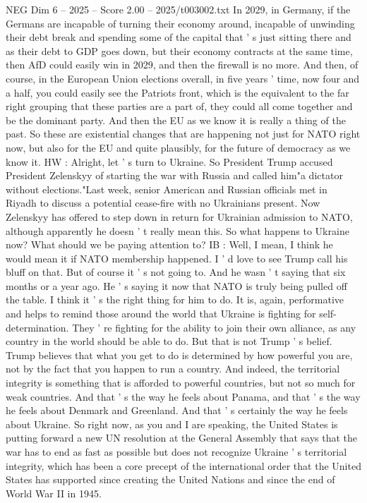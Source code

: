 \begin{textsample}{NEG Dim 6 – 2025 – Score 2.00 – 2025/t003002.txt}
In 2029, in Germany, if the Germans are incapable of turning their economy around, incapable of unwinding their debt break and spending some of the capital that ' s just sitting there and as their debt to GDP goes down, but their economy contracts at the same time, then AfD could easily win in 2029, and then the firewall is no more.
And then, of course, in the European Union elections overall, in five years ' time, now four and a half, you could easily see the Patriots front, which is the equivalent to the far right grouping that these parties are a part of, they could all come together and be the dominant party.
And then the EU as we know it is really a thing of the past.
So these are existential changes that are happening not just for NATO right now, but also for the EU and quite plausibly, for the future of democracy as we know it.
HW : Alright, let ' s turn to Ukraine.
So President Trump accused President Zelenskyy of starting the war with Russia and called him"a dictator without elections."Last week, senior American and Russian officials met in Riyadh to discuss a potential cease-fire with no Ukrainians present.
Now Zelenskyy has offered to step down in return for Ukrainian admission to NATO, although apparently he doesn ' t really mean this.
So what happens to Ukraine now?
What should we be paying attention to?
IB : Well, I mean, I think he would mean it if NATO membership happened.
I ' d love to see Trump call his bluff on that.
But of course it ' s not going to.
And he wasn ' t saying that six months or a year ago.
He ' s saying it now that NATO is truly being pulled off the table.
I think it ' s the right thing for him to do.
It is, again, performative and helps to remind those around the world that Ukraine is fighting for self-determination.
They ' re fighting for the ability to join their own alliance, as any country in the world should be able to do.
But that is not Trump ' s belief.
Trump believes that what you get to do is determined by how powerful you are, not by the fact that you happen to run a country.
And indeed, the territorial integrity is something that is afforded to powerful countries, but not so much for weak countries.
And that ' s the way he feels about Panama, and that ' s the way he feels about Denmark and Greenland.
And that ' s certainly the way he feels about Ukraine.
So right now, as you and I are speaking, the United States is putting forward a new UN resolution at the General Assembly that says that the war has to end as fast as possible but does not recognize Ukraine ' s territorial integrity, which has been a core precept of the international order that the United States has supported since creating the United Nations and since the end of World War II in 1945.

\end{textsample}
